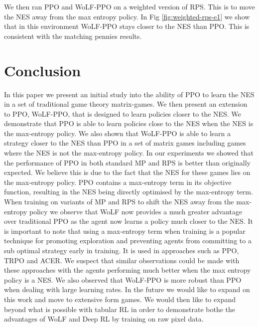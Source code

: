 \documentclass[conference]{IEEEtran}
\begin{document}
We then ran PPO and WoLF-PPO on a weighted version of RPS. This is to move the NES away from the max entropy policy. In Fig \ref{fig:weighted-rps-e1} we show that in this environment WoLF-PPO stays closer to the NES than PPO. This is consistent with the matching pennies results.

\section{Conclusion}


In this paper we present an initial study into the ability of PPO to learn the NES in a set of traditional game theory matrix-games. We then present an extension to PPO, WoLF-PPO, that is designed to learn policies closer to the NES. We demonstrate that PPO is able to learn policies close to the NES when the NES is the max-entropy policy. We also shown that WoLF-PPO is able to learn a strategy closer to the NES than PPO in a set of matrix games including games where the NES is not the max-entropy policy. In our experiments we showed that the performance of PPO in both standard MP and RPS is better than originally expected. We believe this is due to the fact that the NES for these games lies on the max-entropy policy. PPO contains a max-entropy term in its objective function, resulting in the NES being directly optimised by the max-entropy term. When training on variants of MP and RPS to shift the NES away from the max-entropy policy we observe that WoLF now provides a much greater advantage over traditional PPO as the agent now learns a policy much closer to the NES. It is important to note that using a max-entropy term when training is a popular technique for promoting exploration and preventing agents from committing to a sub optimal strategy early in training. It is used in approaches such as PPO\cite{schulman2017proximal}, TRPO\cite{schulman2015trust} and ACER\cite{Wang2017SampleEA}. We suspect that similar observations could be made with these approaches with the agents performing much better when the max entropy policy is a NES. We also observed that WoLF-PPO is more robust than PPO when dealing with large learning rates. In the future we would like to expand on this work and move to extensive form games. We would then like to expand beyond what is possible with tabular RL in order to demonstrate bothe the advantages of WoLF and Deep RL by training on raw pixel data.





\end{document}
